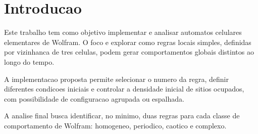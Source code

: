 \chapter{Introducao}
\label{chap_introducao}

Este trabalho tem como objetivo implementar e analisar automatos celulares elementares de Wolfram. O foco e explorar como regras locais simples, definidas por vizinhanca de tres celulas, podem gerar comportamentos globais distintos ao longo do tempo.

A implementacao proposta permite selecionar o numero da regra, definir diferentes condicoes iniciais e controlar a densidade inicial de sitios ocupados, com possibilidade de configuracao agrupada ou espalhada.

A analise final busca identificar, no minimo, duas regras para cada classe de comportamento de Wolfram: homogeneo, periodico, caotico e complexo.
